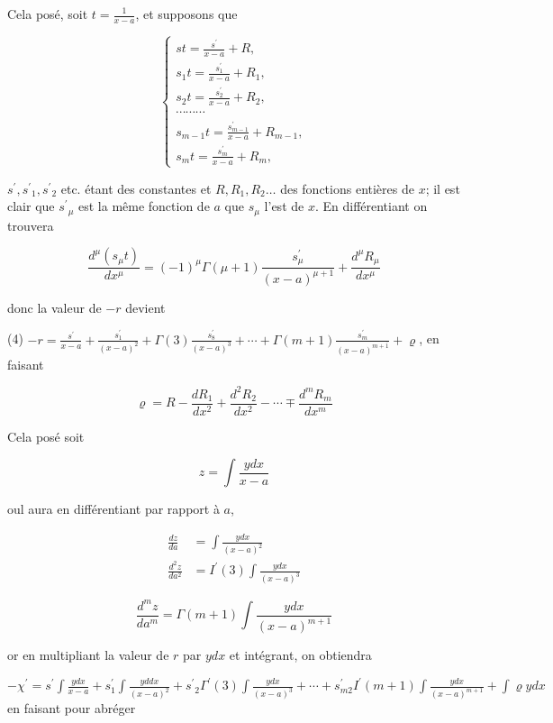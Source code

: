 \documentclass{article}
\begin{document}
Cela posé, soit \(t=\frac{1}{x-a}\), et supposons que

\[
\left\{\begin{array}{c}
s t=\frac{s^{\prime}}{x-a}+R, \\
s_{1} t=\frac{s_{1}^{\prime}}{x-a}+R_{1}, \\
s_{2} t=\frac{s_{2}^{\prime}}{x-a}+R_{2}, \\
\cdots \cdots \cdots \\
s_{m-1} t=\frac{s_{m-1}^{\prime}}{x-a}+R_{m-1}, \\
s_{m} t=\frac{s_{m}^{\prime}}{x-a}+R_{m},
\end{array}\right.
\]

\(s^{\prime}, s^{\prime}{ }_{1}, s^{\prime}{ }_{2}\) etc. étant des constantes et \(R, R_{1}, R_{2} \ldots\) des fonctions entières de \(x\); il est clair que \(s^{\prime}{ }_{\mu}\) est la même fonction de \(a\) que \(s_{\mu}\) l'est de \(x\). En différentiant on trouvera

\[
\frac{d^{\mu}\left(s_{\mu} t\right)}{d x^{\mu}}=(-1)^{\mu} \Gamma(\mu+1) \frac{s_{\mu}^{\prime}}{(x-a)^{\mu+1}}+\frac{d^{\mu} R_{\mu}}{d x^{\mu}}
\]

donc la valeur de \(-r\) devient

(4) \(-r=\frac{s^{\prime}}{x-a}+\frac{s_{1}^{\prime}}{(x-a)^{2}}+\Gamma(3) \frac{s_{8}^{\prime}}{(x-a)^{3}}+\cdots+\Gamma(m+1) \frac{s_{m}^{\prime}}{(x-a)^{m+\overline{1}}}+\varrho\), en faisant

\[
\varrho=R-\frac{d R_{1}}{d x^{2}}+\frac{d^{2} R_{2}}{d x^{2}}-\cdots \mp \frac{d^{m} R_{m}}{d x^{m}}
\]

Cela posé soit

\[
z=\int \frac{y d x}{x-a}
\]

oul aura en différentiant par rapport à \(a\),

\[
\begin{aligned}
\frac{d z}{d a} & =\int \frac{y d x}{(x-a)^{2}} \\
\frac{d^{2} z}{d a^{2}} & =I^{\prime}(3) \int \frac{y d x}{(x-a)^{3}}
\end{aligned}
\]

\[
\frac{d^{m} z}{d a^{m}}=\Gamma(m+1) \int \frac{y d x}{(x-a)^{m+1}}
\]

or en multipliant la valeur de \(r\) par \(y d x\) et intégrant, on obtiendra

\(-\chi^{\prime}=s^{\prime} \int \frac{y d x}{x-a}+s_{1}^{\prime} \int \frac{y d d x}{(x-a)^{2}}+s^{\prime}{ }_{2} \Gamma^{\prime}(3) \int \frac{y d x}{(x-a)^{3}}+\cdots+s_{m 2}^{\prime} I^{\prime}(m+1) \int \frac{y d x}{(x-a)^{m+1}}+\int \varrho y d x\) en faisant pour abréger
\end{document}
